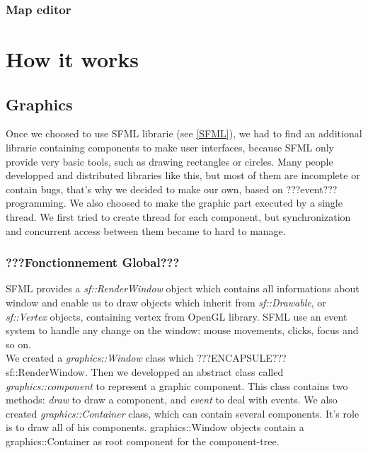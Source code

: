 \documentclass{scrreprt}
\begin{document}
		  \subsection{Map editor}

		  \chapter{How it works}
		  \section{Graphics}
		  Once we choosed to use SFML librarie (see \ref{SFML}), we had to find an additional librarie containing components to make user interfaces, because SFML only provide very basic tools, such as drawing rectangles or circles. Many people developped and distributed libraries like this, but most of them are incomplete or contain bugs, that's why we decided to make our own, based on ???event??? programming. We also choosed to make the graphic part executed by a single thread. We first tried to create thread for each component, but synchronization and concurrent access between them became to hard to manage.

		  \subsection{???Fonctionnement Global???} %
		  SFML provides a \emph{sf::RenderWindow} object which contains all informations about window and enable us to draw objects which inherit from \emph{sf::Drawable}, or \emph{sf::Vertex} objects, containing vertex from OpenGL library. SFML use an event system to handle any change on the window: mouse movements, clicks, focus and so on.\\

		  We created a \emph{graphics::Window} class which ???ENCAPSULE??? sf::RenderWindow. Then we developped an abstract class called \emph{graphics::component} to represent a graphic component. This class contains two methods: \emph{draw} to draw a component, and \emph{event} to deal with events.
		  We also created \emph{graphics::Container} class, which can contain several components. It's role is to draw all of his components. graphics::Window objects contain a graphics::Container as root component for the component-tree.\\
\end{document}
